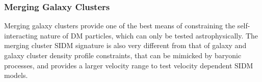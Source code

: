 


\subsubsection{Merging Galaxy Clusters}

Merging galaxy clusters provide one of the best means of constraining the
self-interacting nature of DM particles, which can only be tested
astrophysically. The merging cluster SIDM signature is also very different from
that of galaxy and galaxy cluster density profile constraints, that can be
mimicked by baryonic processes, and provides a larger velocity range to test
velocity dependent SIDM models.

